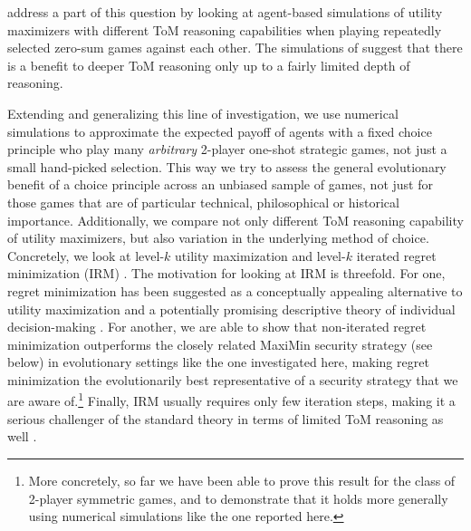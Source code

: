 \documentclass{llncs}
\begin{document}
\citet{Weerdde-WeerdVerbrugge2013:How-much-does-i} address a part of
this question by looking at agent-based simulations of utility
maximizers with different ToM reasoning capabilities when playing
repeatedly selected zero-sum games against each other. The simulations
of \citeauthor{Weerdde-WeerdVerbrugge2013:How-much-does-i} suggest
that there is a benefit to deeper ToM reasoning only up to a fairly
limited depth of reasoning. 

Extending and generalizing this line of investigation, we use
numerical simulations to approximate the expected payoff of agents
with a fixed choice principle who play many \emph{arbitrary} 2-player
one-shot strategic games, not just a small hand-picked selection. This
way we try to assess the general evolutionary benefit of a choice
principle across an unbiased sample of games, not just for those games
that are of particular technical, philosophical or historical
importance. Additionally, we compare not only different ToM reasoning
capability of utility maximizers, but also variation in the underlying
method of choice. Concretely, we look at level-$k$ utility
maximization and level-$k$ iterated regret minimization (IRM)
\citep{HalpernPass2012:Iterated-Regret}. The motivation for looking at
IRM is threefold. For one, regret minimization has been suggested as a
conceptually appealing alternative to utility maximization and a
potentially promising descriptive theory of individual decision-making
\citep{LoomesSugden1982:Regret-Theory:-}. For another, we are able to
show that non-iterated regret minimization outperforms the closely
related MaxiMin security strategy (see below) in evolutionary settings
like the one investigated here, making regret minimization the
evolutionarily best representative of a security strategy that we are
aware of.\footnote{More concretely, so far we have been able to prove
  this result for the class of 2-player symmetric games, and to
  demonstrate that it holds more generally using numerical simulations
  like the one reported here.} Finally, IRM usually requires only few
iteration steps, making it a serious challenger of the standard theory
in terms of limited ToM reasoning as well
\citep[c.f.][]{HalpernPass2012:Iterated-Regret}.
\end{document}
